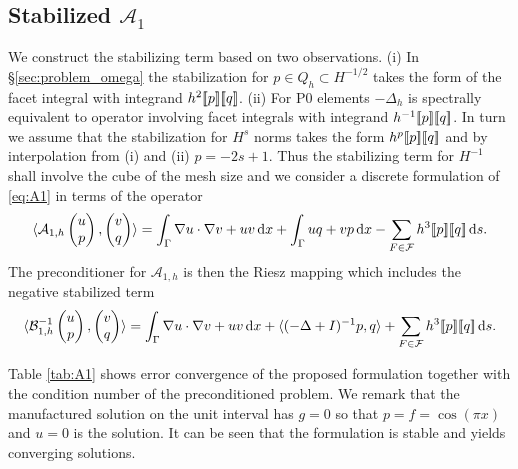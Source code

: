 \subsection{Stabilized $\mathcal{A}_1$} We construct the stabilizing term
based on two observations. (i) In \S\ref{sec:problem_omega} the stabilization
for $p\in Q_h\subset H^{-1/2}$ takes the form of the facet integral with integrand $h^{2}[\![p]\!][\![q]\!]$.
(ii) For P0 elements $-\Delta_h$ is spectrally equivalent to operator involving
facet integrals with integrand $h^{-1}[\![p]\!][\![q]\!]$. In turn we assume
that the stabilization for $H^s$ norms takes the form $h^{p}[\![p]\!][\![q]\!]$
and by interpolation from (i) and (ii) $p=-2s+1$. Thus the stabilizing term for $H^{-1}$ shall
involve the cube of the mesh size and we consider a discrete formulation of \eqref{eq:A1}
in terms of the operator
%
\[
\langle\mathcal{A}_{1, h}\begin{pmatrix}u\\p\end{pmatrix},
  \begin{pmatrix}v\\q\end{pmatrix}
    \rangle
    =
    \int_{\Gamma}\nabla u\cdot\nabla v+uv\,\mathrm{d}x+\int_{\Gamma}uq + vp\,\mathrm{d}x-
    \sum_{F\in\mathcal{F}}h^3[\![p]\!][\![q]\!]\,\mathrm{d}s.
\]
The preconditioner for $\mathcal{A}_{1, h}$ is then the Riesz mapping which
includes the negative stabilized term
\[
\langle\mathcal{B}^{-1}_{1, h}\begin{pmatrix}u\\p\end{pmatrix},
  \begin{pmatrix}v\\q\end{pmatrix}
    \rangle
    =
    \int_{\Gamma}\nabla u\cdot\nabla v+uv\,\mathrm{d}x+
    \langle(-\Delta+I)^{-1}p, q\rangle+
    \sum_{F\in\mathcal{F}}h^3[\![p]\!][\![q]\!]\,\mathrm{d}s.
\]

Table \ref{tab:A1} shows error convergence of the proposed formulation
together with the condition number of the preconditioned problem. We remark
that the manufactured solution on the unit interval has $g=0$ so that $p=f=\cos(\pi x)$
and $u=0$ is the solution. It can be seen that the formulation is stable and
yields converging solutions.

